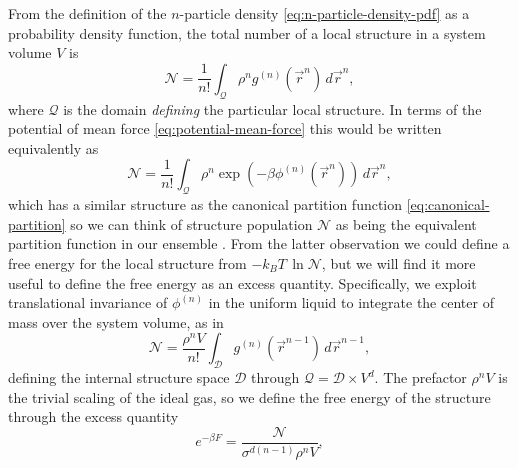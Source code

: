 \documentclass[11pt,twoside]{report}
\begin{document}
From the definition of the $n$-particle density \eqref{eq:n-particle-density-pdf} as a probability density function, the total number of a local structure in a system volume $V$ is
\begin{equation}\label{eq:structure-population}
  \mathcal{N}
  =
  \frac{1}{n!}
  \int_{\mathcal{Q}}
  \rho^n g^{(n)}(\vec{r}^n)
  \, d\vec{r}^n,
\end{equation}
where $\mathcal{Q}$ is the domain \emph{defining} the particular local structure.
In terms of the potential of mean force \eqref{eq:potential-mean-force} this would be written equivalently as
\begin{equation*}
  \mathcal{N}
  =
  \frac{1}{n!}
  \int_{\mathcal{Q}}
  \rho^n \exp{\left(-\beta\phi^{(n)}(\vec{r}^n)\right)}
  \, d\vec{r}^n,
\end{equation*}
which has a similar structure as the canonical partition function \eqref{eq:canonical-partition} so we can think of structure population $\mathcal{N}$ as being the equivalent partition function in our ensemble%
.
From the latter observation we could define a free energy for the local structure from $-k_B T \, \ln{\mathcal{N}}$,
but we will find it more useful to define the free energy as an excess quantity.
Specifically, we exploit translational invariance of $\phi^{(n)}$ in the uniform liquid to integrate the center of mass over the system volume, as in
\begin{equation}
  \mathcal{N}
  =
  \frac{\rho^n V}{n!}
  \int_\mathcal{D}
  g^{(n)}(\vec{r}^{n-1})
  \, d\vec{r}^{n-1},
\end{equation}
defining the internal structure space $\mathcal{D}$ through $\mathcal{Q} = \mathcal{D} \times V^d$.
The prefactor $\rho^n V$ is the trivial scaling of the ideal gas, so we define the free energy of the structure through the excess quantity%
\begin{equation*}
  e^{-\beta F}
  =
  \frac{\mathcal{N}}{\sigma^{d(n-1)} \rho^n V},
\end{equation*}
\end{document}
